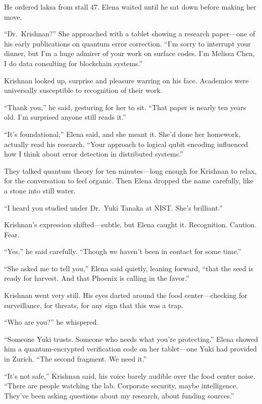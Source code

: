 He ordered laksa from stall 47. Elena waited until he sat down before making her move.

``Dr.~Krishnan?'' She approached with a tablet showing a research paper---one of his early publications on quantum error correction. ``I'm sorry to interrupt your dinner, but I'm a huge admirer of your work on surface codes. I'm Melissa Chen, I do data consulting for blockchain systems.''

Krishnan looked up, surprise and pleasure warring on his face. Academics were universally susceptible to recognition of their work.

``Thank you,'' he said, gesturing for her to sit. ``That paper is nearly ten years old. I'm surprised anyone still reads it.''

``It's foundational,'' Elena said, and she meant it. She'd done her homework, actually read his research. ``Your approach to logical qubit encoding influenced how I think about error detection in distributed systems.''

They talked quantum theory for ten minutes---long enough for Krishnan to relax, for the conversation to feel organic. Then Elena dropped the name carefully, like a stone into still water.

``I heard you studied under Dr.~Yuki Tanaka at NIST. She's brilliant.''

Krishnan's expression shifted---subtle, but Elena caught it. Recognition. Caution. Fear.

``Yes,'' he said carefully. ``Though we haven't been in contact for some time.''

``She asked me to tell you,'' Elena said quietly, leaning forward, ``that the seed is ready for harvest. And that Phoenix is calling in the favor.''

Krishnan went very still. His eyes darted around the food center---checking for surveillance, for threats, for any sign that this was a trap.

``Who are you?'' he whispered.

``Someone Yuki trusts. Someone who needs what you're protecting.'' Elena showed him a quantum-encrypted verification code on her tablet---one Yuki had provided in Zurich. ``The second fragment. We need it.''

``It's not safe,'' Krishnan said, his voice barely audible over the food center noise. ``There are people watching the lab. Corporate security, maybe intelligence. They've been asking questions about my research, about funding sources.''

